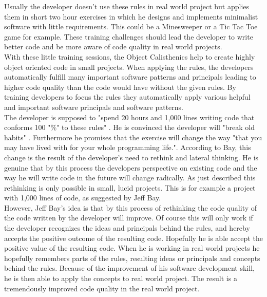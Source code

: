 Usually the developer doesn't use these rules in real world project but applies them in short two hour exercises in which he designs and implements minimalist software with little requirements. This could be a Minesweeper or a Tic Tac Toe game for example. These training challenges should lead the developer to write better code and be more aware of code quality in real world projects.\\

With these little training sessions, the Object Calisthenics help to create highly object oriented code  in small projects. When applying the rules, the developers automatically fulfill many important software patterns and principals leading to higher code quality than the code would have without the given rules. By training developers to focus the rules they automatically apply various helpful and important software principals and software patterns. \\

The developer is supposed to "spend 20 hours and 1,000 lines writing code that conforms 100 "\%"  to these rules" \cite[p. 80]{oc2008}. He is convinced the developer will "break old habits" \cite[p. 80]{oc2008}. Furthermore he promises that the exercise will change the way "that you may have lived with for your whole programming life."\cite[p. 80]{oc2008}. According to Bay, this change is the result of the developer's need to rethink and lateral thinking. He is genuine that by this process the developers perspective on existing code and the way he will write code in the future will change radically. As just described this rethinking is only possible in small, lucid projects. This is for example a project with 1,000 lines of code, as suggested by Jeff Bay. \\

However, Jeff Bay's idea is that by this process of rethinking the code quality of the code written by the developer will improve.
Of course this will only work if the developer recognizes the ideas and principals behind the rules, and hereby accepts the positive outcome of the resulting code. Hopefully he is able accept the positive value of the resulting code. When he is working in real world projects he hopefully remembers parts of the rules, resulting ideas or principals and concepts behind the rules. Because of the improvement of his software development skill, he is then able to apply the concepts to real world project. The result is a tremendously improved code quality in the real world project.\\

